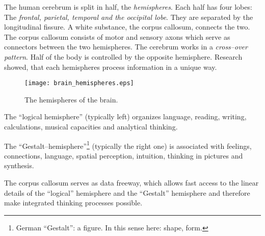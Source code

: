 \documentclass[../main.tex]{subfiles}
\begin{document}
The human cerebrum is split in half, the \emph{hemispheres}.
Each half has four lobes: The \emph{frontal, parietal, temporal and the occipital lobe}.
They are separated by the longitudinal fissure.
A white substance, the {corpus callosum}, connects the two.
The corpus callosum consists of motor and sensory axons which serve as connectors between the two hemispheres.
The cerebrum works in a \emph{cross--over pattern}.
Half of the body is controlled by the opposite hemisphere.
Research showed, that each hemispheres process information in a unique way.

\begin{figure}[htb]
  \centering
  \texttt{[image: brain\_hemispheres.eps]}
  \caption{The hemispheres of the brain\cite{needpix}.}
\end{figure}


The ``logical hemisphere'' (typically left) organizes language, reading, writing, calculations, musical capacities and analytical thinking.

The ``Gestalt--hemisphere''\footnote{German ``Gestalt'': a figure. In this sense here: shape, form.} (typically the right one) is associated with feelings, connections, language, spatial perception, intuition, thinking in pictures and synthesis.

The corpus callosum serves as data freeway, which allows fast access to the linear details of the ``logical'' hemisphere and the ``Gestalt'' hemisphere and therefore make integrated thinking processes possible.
\end{document}
